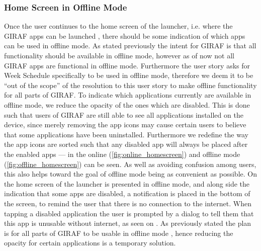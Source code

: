 \subsubsection{Home Screen in Offline Mode}
Once the user continues to the home screen of the launcher, i.e. where the GIRAF apps can be launched , there should be some indication of which apps can be used in offline mode. 
As stated previously the intent for GIRAF is that all functionality should be available in offline mode, however as of now not all GIRAF apps are functional in offline mode. 
Furthermore the user story asks for Week Schedule specifically to be used in offline mode, therefore we deem it to be \enquote{out of the scope} of the resolution to this user story to make offline functionality for all parts of GIRAF.
To indicate which applications currently are available in offline mode, we reduce the opacity of the ones which are disabled.
This is done such that users of GIRAF are still able to see all applications installed on the device, since merely removing the app icons may cause certain users to believe that some applications have been uninstalled.
Furthermore we redefine the way the app icons are sorted such that any disabled app will always be placed after the enabled apps --- in  the online (\ref{fig:online_homescreen}) and offline mode (\ref{fig:offline_homescreen}) can be seen.
As well as avoiding confusion among users, this also helps toward the goal of offline mode being as convenient as possible.
On  the home screen of the launcher is presented in offline mode, and along side the indication that some apps are disabled, a notification is placed in the bottom of the screen, to remind the user that there is no connection to the internet.
When tapping a disabled application the user is prompted by a dialog to tell them that this app is unusable without internet, as seen on .  
As previously stated the plan is for all parts of GIRAF to be usable in offline mode , hence reducing the opacity for certain applications is a temporary solution.
